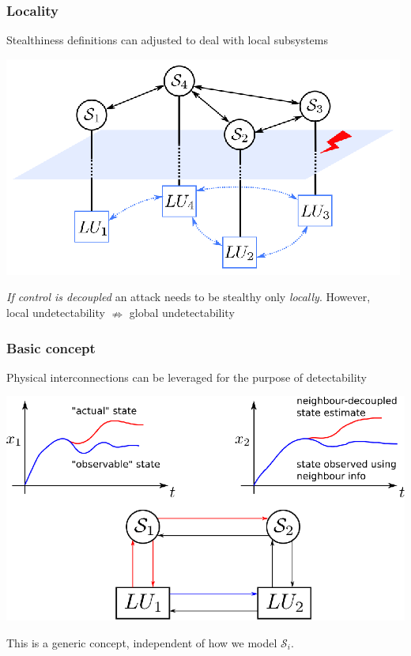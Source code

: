 \documentclass[presentation]{beamer}
\begin{document}
\begin{frame}
	\frametitle{Locality}
	\centering
	Stealthiness definitions can adjusted to deal with local subsystems

	\vfill
	\includegraphics[]{fig/ecc19lss.eps}

	\vfill
	\emph{If control is decoupled} an attack needs to be stealthy only \emph{locally}.
	However, \\[2ex]
	local undetectability $\nRightarrow$ global undetectability
\end{frame}

\begin{frame}
	\frametitle{Basic concept}
	
	\centering
	\begin{block}{}
		Physical interconnections can be leveraged for the purpose of detectability
	\end{block}

	\vfill
	\includegraphics[scale=0.7]{fig/ecc-concept.eps}

	\vfill\footnotesize
	This is a generic concept, independent of how we model $\mathcal S_i$.
\end{frame}
\end{document}
